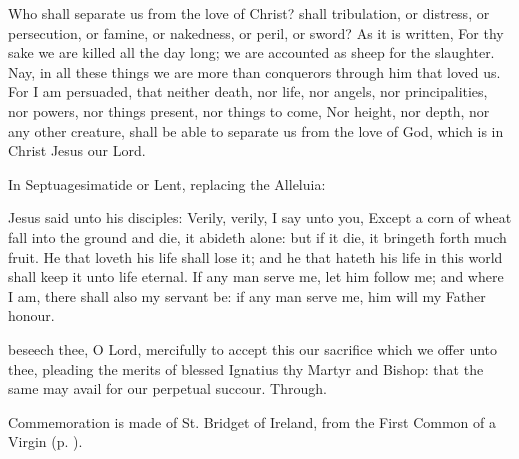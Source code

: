  Who shall separate us from the love of Christ? shall tribulation, or distress, or persecution, or famine, or nakedness, or peril, or sword? As it is written, For thy sake we are killed all the day long; we are accounted as sheep for the slaughter. Nay, in all these things we are more than conquerors through him that loved us. For I am persuaded, that neither death, nor life, nor angels, nor principalities, nor powers, nor things present, nor things to come, Nor height, nor depth, nor any other creature, shall be able to separate us from the love of God, which is in Christ Jesus our Lord.


\begin{rubric}
{In Septuagesimatide or Lent, replacing the Alleluia:}
\end{rubric}\par\noindent
{}

 Jesus said unto his disciples: Verily, verily, I say unto you, Except a corn of wheat fall into the ground and die, it abideth alone: but if it die, it bringeth forth much fruit. He that loveth his life shall lose it; and he that hateth his life in this world shall keep it unto life eternal. If any man serve me, let him follow me; and where I am, there shall also my servant be: if any man serve me, him will my Father honour.


\secret
{} beseech thee, O Lord, mercifully to accept this our sacrifice which we offer unto thee, pleading the merits of blessed Ignatius thy Martyr and Bishop: that the same may avail for our perpetual succour. Through.

\begin{rubric}
    Commemoration is made of St. Bridget of Ireland, from the First Common of a Virgin (p. \pageref{CommonVirginOnlyI}).
\end{rubric}

